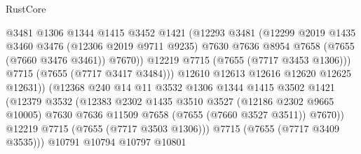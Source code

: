 \begin{lexlean}{RustCore}
\begin{coremodule}
                                  @3481
                                  @1306
                                  @1344
                                  @1415
                                  @3452
                                  @1421
                                  (@12293
                                    @3481
                                    (@12299
                                      @2019
                                      @1435
                                      @3460
                                      @3476
                                      (@12306 @2019 @9711 @9235)
                                      @7630
                                      @7636
                                      @8954
                                      @7658
                                      (@7655 (@7660 @3476 @3461))
                                      @7670))
                                  @12219
                                  @7715
                                  (@7655 (@7717 @3453 @1306)))
                                @7715
                                (@7655 (@7717 @3417 @3484)))
                              @12610
                              @12613
                              @12616
                              @12620
                              @12625
                              @12631))
                          (@12368
                            @240
                            @14
                            @11
                            @3532
                            @1306
                            @1344
                            @1415
                            @3502
                            @1421
                            (@12379
                              @3532
                              (@12383
                                @2302
                                @1435
                                @3510
                                @3527
                                (@12186 @2302 @9665 @10005)
                                @7630
                                @7636
                                @11509
                                @7658
                                (@7655 (@7660 @3527 @3511))
                                @7670))
                            @12219
                            @7715
                            (@7655 (@7717 @3503 @1306)))
                          @7715
                          (@7655 (@7717 @3409 @3535)))
                        @10791
                        @10794
                        @10797
                        @10801

\end{coremodule}
\end{lexlean}
